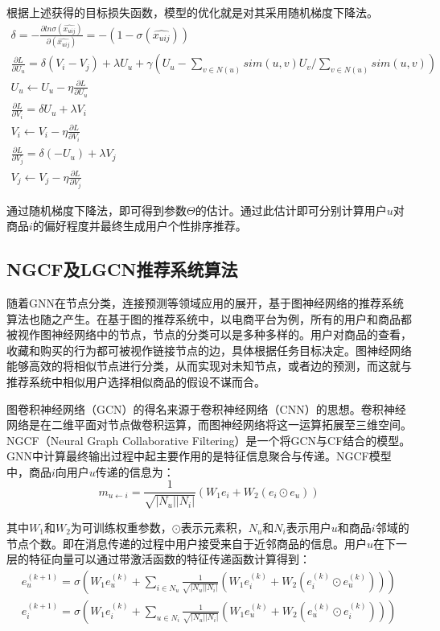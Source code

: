 \documentclass[lang=cn,11pt,a4paper,cite=authoryear]{elegantpaper}
\begin{document}
根据上述获得的目标损失函数，模型的优化就是对其采用随机梯度下降法。
\begin{gather}
  \delta = -\frac{\partial ln\sigma(\hat{x_{uij}})}{\partial(\hat{x_{uij}})} = -(1-\sigma (\hat{x_{uij}})) \\
  \frac{\partial L}{\partial U_u} = \delta(V_i-V_j)+\lambda U_u+\gamma(U_u-\sum_{v\in N(u)}sim(u,v)U_v / \sum_{v\in N(u)}sim(u,v)) \\
  U_u \leftarrow U_u - \eta \frac{\partial L}{\partial U_u} \\
  \frac{\partial L}{\partial V_i} = \delta U_u+\lambda V_i \\
  V_i \leftarrow V_i - \eta \frac{\partial L}{\partial V_i} \\
  \frac{\partial L}{\partial V_j} = \delta (-U_u)+\lambda V_j \\
  V_j \leftarrow V_j - \eta \frac{\partial L}{\partial V_j} 
\end{gather}

通过随机梯度下降法，即可得到参数$\Theta$的估计。通过此估计即可分别计算用户$u$对商品$i$的偏好程度并最终生成用户个性排序推荐。

\subsection{NGCF及LGCN推荐系统算法}
随着GNN在节点分类，连接预测等领域应用的展开，基于图神经网络的推荐系统算法也随之产生。在基于图的推荐系统中，以电商平台为例，所有的用户和商品都被视作图神经网络中的节点，节点的分类可以是多种多样的。用户对商品的查看，收藏和购买的行为都可被视作链接节点的边，具体根据任务目标决定。图神经网络能够高效的将相似节点进行分类，从而实现对未知节点，或者边的预测，而这就与推荐系统中相似用户选择相似商品的假设不谋而合。

图卷积神经网络（GCN）的得名来源于卷积神经网络（CNN）的思想。卷积神经网络是在二维平面对节点做卷积运算，而图神经网络将这一运算拓展至三维空间。NGCF（Neural Graph Collaborative Filtering）是一个将GCN与CF结合的模型。GNN中计算最终输出过程中起主要作用的是特征信息聚合与传递。NGCF模型中，商品$i$向用户$u$传递的信息为：
\begin{equation}
  m_{u \leftarrow i} = \frac{1}{\sqrt{|N_u||N_i|}}(W_1e_i+W_2(e_i \odot e_u))
\end{equation}

其中$W_1$和$W_2$为可训练权重参数，$\odot$表示元素积，$N_u$和$N_i$表示用户$u$和商品$i$邻域的节点个数。即在消息传递的过程中用户接受来自于近邻商品的信息。用户$u$在下一层的特征向量可以通过带激活函数的特征传递函数计算得到：
\begin{gather}
  e_u^{(k+1)} = \sigma(W_1e_u^{(k)}+\sum_{i\in N_u}\frac{1}{\sqrt{|N_u||N_i|}}(W_1e_i^{(k)}+W_2(e_i^{(k)}\odot e_u^{(k)}))) \\
  e_i^{(k+1)} = \sigma(W_1e_i^{(k)}+\sum_{u\in N_i}\frac{1}{\sqrt{|N_u||N_i|}}(W_1e_u^{(k)}+W_2(e_u^{(k)}\odot e_i^{(k)})))
\end{gather}
\end{document}
